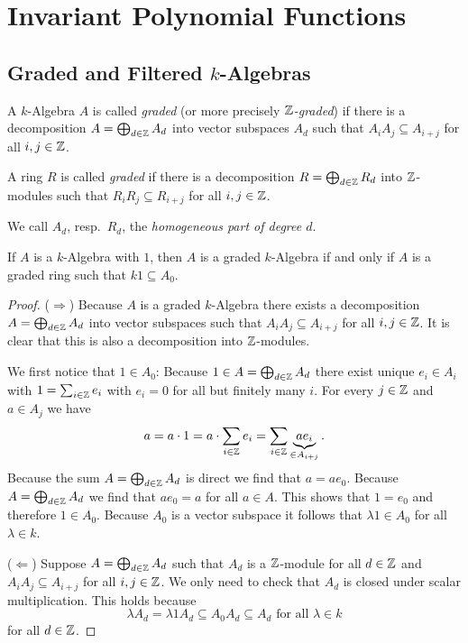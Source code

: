 \chapter{Invariant Polynomial Functions}





\section{Graded and Filtered \texorpdfstring{$k$}{k}-Algebras}


\begin{defi}
  A $k$-Algebra $A$ is called \emph{graded} (or more precisely \emph{$\mathbb{Z}$-graded}) if there is a decomposition $A = \bigoplus_{d \in \mathbb{Z}} A_d$ into vector subspaces $A_d$ such that $A_i A_j \subseteq A_{i+j}$ for all $i,j \in \mathbb{Z}$.
  
  A ring $R$ is called \emph{graded} if there is a decomposition $R = \bigoplus_{d \in \mathbb{Z}} R_d$ into $\mathbb{Z}$-modules such that $R_i R_j \subseteq R_{i+j}$ for all $i,j \in \mathbb{Z}$.
  
  We call $A_d$, resp.\ $R_d$, the \emph{homogeneous part of degree $d$}.
\end{defi}

\begin{rem}
  If $A$ is a $k$-Algebra with $1$, then $A$ is a graded $k$-Algebra if and only if $A$ is a graded ring such that $k1 \subseteq A_0$.
\end{rem}
\begin{proof}
  ($\Rightarrow$)
  Because $A$ is a graded $k$-Algebra there exists a decomposition $A = \bigoplus_{d \in \mathbb{Z}} A_d$ into vector subspaces such that $A_i A_j \subseteq A_{i+j}$ for all $i,j \in \mathbb{Z}$.
  It is clear that this is also a decomposition into $\mathbb{Z}$-modules.
  
  We first notice that $1 \in A_0$:
  Because $1 \in A = \bigoplus_{d \in \mathbb{Z}} A_d$ there exist unique $e_i \in A_i$ with $1 = \sum_{i \in \mathbb{Z}} e_i$ with $e_i = 0$ for all but finitely many $i$.
  For every $j \in \mathbb{Z}$ and $a \in A_j$ we have
  \[
      a
    = a \cdot 1
    = a \cdot \sum_{i \in \mathbb{Z}} e_i
    = \sum_{i \in \mathbb{Z}} \underbrace{a e_i}_{\in A_{i+j}}.
  \]
  Because the sum $A = \bigoplus_{d \in \mathbb{Z}} A_d$ is direct we find that $a = a e_0$.
  Because $A = \bigoplus_{d \in \mathbb{Z}} A_d$ we find that $a e_0 = a$ for all $a \in A$.
  This shows that $1 = e_0$ and therefore $1 \in A_0$.
  Because $A_0$ is a vector subspace it follows that $\lambda 1 \in A_0$ for all $\lambda \in k$.
  
  ($\Leftarrow$)
  Suppose $A = \bigoplus_{d \in \mathbb{Z}} A_d$ such that $A_d$ is a $\mathbb{Z}$-module for all $d \in \mathbb{Z}$ and $A_i A_j \subseteq A_{i+j}$ for all $i,j \in \mathbb{Z}$.
  We only need to check that $A_d$ is closed under scalar multiplication.
  This holds because
  \[
              \lambda A_d
    =         \lambda 1 A_d
    \subseteq A_0 A_d
    \subseteq A_d
    \text{ for all }
    \lambda \in k
  \]
  for all $d \in \mathbb{Z}$.
\end{proof}


